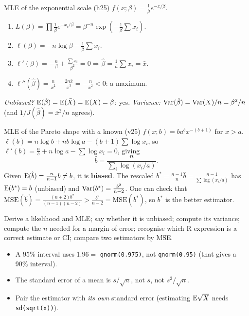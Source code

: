 \begin{example}{MLE of the exponential scale (h25)}
$f(x;\beta) = \frac1\beta e^{-x/\beta}$.
\begin{enumerate}
  \item $L(\beta) = \prod \frac1\beta e^{-x_i/\beta} = \beta^{-n}\exp\left(-\frac1\beta\sum x_i\right)$.
  \item $\ell(\beta) = -n\log\beta - \frac1\beta\sum x_i$.
  \item $\ell'(\beta) = -\frac n\beta + \frac{\sum x_i}{\beta^2} = 0 \Rightarrow \hat\beta = \frac1n\sum x_i = \bar x$.
  \item $\ell''(\hat\beta) = \frac{n}{\bar x^2} - \frac{2n\bar x}{\bar x^3} = -\frac{n}{\bar x^2} < 0$: a maximum.
\end{enumerate}
\emph{Unbiased?} $\mathrm{E}(\hat\beta) = \mathrm{E}(\bar X) = \mathrm{E}(X) = \beta$: yes. \emph{Variance:} $\mathrm{Var}(\hat\beta) = \mathrm{Var}(X)/n = \beta^2/n$ (and $1/J(\hat\beta) = \bar x^2/n$ agrees).
\end{example}

\begin{example}{MLE of the Pareto shape with $a$ known (v25)}
$f(x;b) = b a^b x^{-(b+1)}$ for $x > a$.
$\ell(b) = n\log b + nb\log a - (b+1)\sum\log x_i$, so
$\ell'(b) = \frac nb + n\log a - \sum\log x_i = 0$, giving
\[
\hat b = \frac{n}{\sum_{i}\log(x_i/a)} .
\]
Given $\mathrm{E}(\hat b) = \frac{n}{n-1}b \ne b$, it is \textbf{biased}. The rescaled $b^* = \frac{n-1}{n}\hat b = \frac{n-1}{\sum\log(x_i/a)}$ has $\mathrm{E}(b^*) = b$ (unbiased) and $\mathrm{Var}(b^*) = \frac{b^2}{n-2}$. One can check that $\mathrm{MSE}(\hat b) = \frac{(n+2)b^2}{(n-1)(n-2)} > \frac{b^2}{n-2} = \mathrm{MSE}(b^*)$, so $b^*$ is the better estimator.
\end{example}

\begin{exam}
Derive a likelihood and MLE; say whether it is unbiased; compute its variance; compute the $n$ needed for a margin of error; recognise which R expression is a correct estimate or CI; compare two estimators by MSE.
\end{exam}

\begin{traps}
\begin{itemize}
  \item A 95\% interval uses $1.96 = $ \texttt{qnorm(0.975)}, not \texttt{qnorm(0.95)} (that gives a 90\% interval).
  \item The standard error of a mean is $s/\sqrt n$, not $s$, not $s^2/\sqrt n$.
  \item Pair the estimator with \emph{its own} standard error (estimating $\mathrm{E}\sqrt X$ needs \texttt{sd(sqrt(x))}).
\end{itemize}
\end{traps}

\newpage
